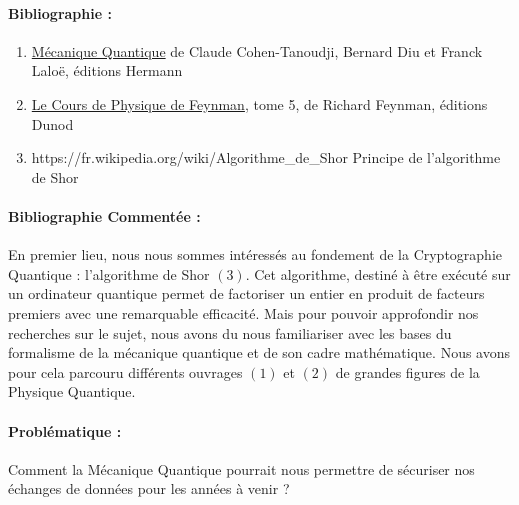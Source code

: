 \documentclass{article}
\begin{document}
\paragraph{Bibliographie :}

\begin{enumerate}
    \item \underline{Mécanique Quantique} de Claude Cohen-Tanoudji, Bernard Diu et Franck Laloë, éditions Hermann
    \item \underline{Le Cours de Physique de Feynman}, tome 5, de Richard Feynman, éditions Dunod
    \item https://fr.wikipedia.org/wiki/Algorithme\_de\_Shor Principe de l'algorithme de Shor
\end{enumerate}

\paragraph{Bibliographie Commentée :} En premier lieu, nous nous sommes intéressés au fondement de la Cryptographie Quantique : l'algorithme de Shor $(3)$. Cet algorithme, destiné à être exécuté sur un ordinateur quantique permet de factoriser un entier en produit de facteurs premiers avec une remarquable efficacité. Mais pour pouvoir approfondir nos recherches sur le sujet, nous avons du nous familiariser avec les bases du formalisme de la mécanique quantique et de son cadre mathématique. Nous avons pour cela parcouru différents ouvrages $(1)$ et $(2)$ de grandes figures de la Physique Quantique.

\paragraph{Problématique :} Comment la Mécanique Quantique pourrait nous permettre de sécuriser nos échanges de données pour les années à venir ?
\end{document}
